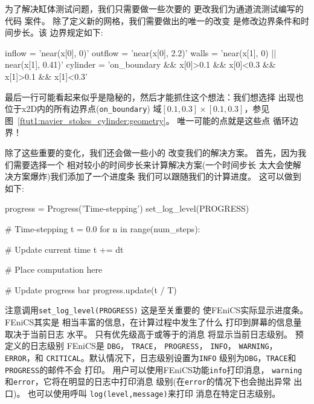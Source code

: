 
为了解决缸体测试问题，我们只需要做一些次要的
更改我们为通道流测试编写的代码
案件。 除了定义新的网格，我们需要做出的唯一的改变
是修改边界条件和时间步长。该
边界规定如下:

\begin{python}
inflow   = 'near(x[0], 0)'
outflow  = 'near(x[0], 2.2)'
walls    = 'near(x[1], 0) || near(x[1], 0.41)'
cylinder = 'on_boundary && x[0]>0.1 && x[0]<0.3 && x[1]>0.1 && x[1]<0.3'
\end{python}
最后一行可能看起来似乎是隐秘的，然后才能抓住这个想法：我们想选择
出现也位于x2D内的所有边界点(\verb!on_boundary!)
域$[0.1,0.3]\times [0.1,0.3]$，参见图~\ref{ftut1:navier_stokes_cylinder:geometry}。
唯一可能的点就是这些点
循环边界！


除了这些重要的变化，我们还会做一些小的
改变我们的解决方案。 首先，因为我们需要选择一个
相对较小的时间步长来计算解决方案(一个时间步长
太大会使解决方案爆炸)我们添加了一个进度条
我们可以跟随我们的计算进度。 这可以做到
如下:


\begin{python}
progress = Progress('Time-stepping')
set_log_level(PROGRESS)

# Time-stepping
t = 0.0
for n in range(num_steps):

    # Update current time
    t += dt

    # Place computation here

    # Update progress bar
    progress.update(t / T)
\end{python}

\begin{notice}[日志级别和FEniCS中的打印]
注意调用\verb!set_log_level(PROGRESS)! 这是至关重要的
使FEniCS实际显示进度条。 FEniCS其实是
相当丰富的信息，在计算过程中发生了什么
打印到屏幕的信息量取决于当前日志
水平。 只有优先级高于或等于的消息
将显示当前日志级别。 预定义的日志级别
FEniCS是
\texttt{DBG}，
\texttt{TRACE}，
\texttt{PROGRESS}，
\texttt{INFO}，
\texttt{WARNING}，
\texttt{ERROR}，和
\texttt{CRITICAL}。默认情况下，日志级别设置为\texttt{INFO}
级别为\texttt{DBG}，\texttt{TRACE}和\texttt{PROGRESS}的邮件不会
打印。 用户可以使用FEniCS功能\texttt{info}打印消息，
\texttt{warning}和\texttt{error}，它将在明显的日志中打印消息
级别(在\texttt{error}的情况下也会抛出异常
出口)。 也可以使用呼叫 \texttt{log(level,message)}来打印
消息在特定日志级别。
\end{notice}

